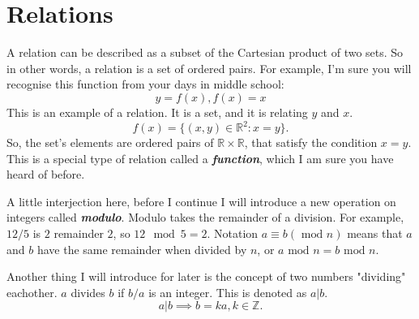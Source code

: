 \documentclass{report}
\newcommand{\modu}{\text{ mod }}
\begin{document}
\section{Relations}
A relation can be described as a subset of the Cartesian product of two sets. So in other words, a relation is a set of ordered pairs.
For example, I'm sure you will recognise this function from your days in middle school: $$y = f(x), f(x) = x$$
This is an example of a relation. It is a set, and it is relating $y$ and $x$. $$f(x) = \{(x, y) \in \mathbb{R}^2 : x = y\}.$$
So, the set's elements are ordered pairs of $\mathbb{R} \times \mathbb{R}$, that satisfy the condition $x = y$.
This is a special type of relation called a \textbf{\textit{function}}, which I am sure you have heard of before.

A little interjection here, before I continue I will introduce a new operation on integers called \textbf{\textit{modulo}}.
Modulo takes the remainder of a division. For example, $12/5$ is $2$ remainder $2$, so $12 \mod 5 = 2$.
Notation $a \equiv b (\modu n)$ means that $a$ and $b$ have the same remainder when divided by $n$, or $a \modu n = b \modu n$.

Another thing I will introduce for later is the concept of two numbers "dividing" eachother. $a$ divides $b$ if $b/a$ is an integer.
This is denoted as $a | b$. $$a | b \implies b = ka, k \in \mathbb{Z}.$$
\end{document}

